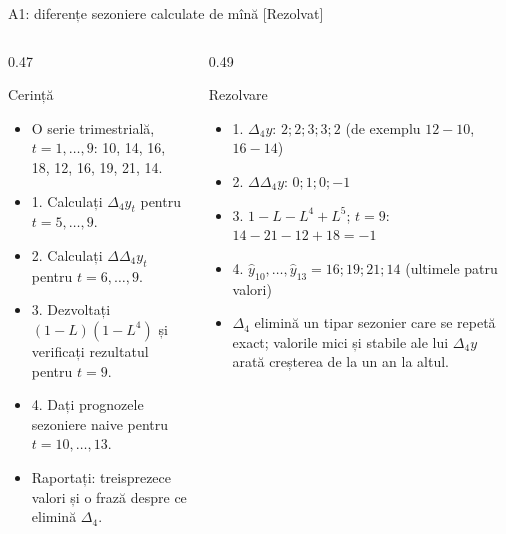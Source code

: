\begin{frame}{A1: diferențe sezoniere calculate de mînă [Rezolvat]}
\itemsize{\scriptsize}
\begin{columns}[T]
\begin{column}{0.47\textwidth}
\begin{block}{Cerință}
\begin{itemize}
    \item O serie trimestrială, $t = 1, \dots, 9$: 10, 14, 16, 18, 12, 16, 19, 21, 14.
    \item 1. Calculați $\Delta_4 y_t$ pentru $t = 5, \dots, 9$.
    \item 2. Calculați $\Delta\Delta_4 y_t$ pentru $t = 6, \dots, 9$.
    \item 3. Dezvoltați $(1 - L)(1 - L^4)$ și verificați rezultatul pentru $t = 9$.
    \item 4. Dați prognozele sezoniere naive pentru $t = 10, \dots, 13$.
    \item Raportați: treisprezece valori și o frază despre ce elimină $\Delta_4$.
\end{itemize}
\end{block}
\end{column}
\begin{column}{0.49\textwidth}
\begin{exampleblock}{Rezolvare}
\begin{itemize}
    \item 1. $\Delta_4 y$: $2; 2; 3; 3; 2$ (de exemplu $12 - 10$, $16 - 14$)
    \item 2. $\Delta\Delta_4 y$: $0; 1; 0; -1$
    \item 3. $1 - L - L^4 + L^5$; $t = 9$: $14 - 21 - 12 + 18 = -1$
    \item 4. $\hat y_{10}, \dots, \hat y_{13} = 16; 19; 21; 14$ (ultimele patru valori)
    \item $\Delta_4$ elimină un tipar sezonier care se repetă exact; valorile mici și stabile ale lui $\Delta_4 y$ arată creșterea de la un an la altul.
\end{itemize}
\end{exampleblock}
\end{column}
\end{columns}
\end{frame}


